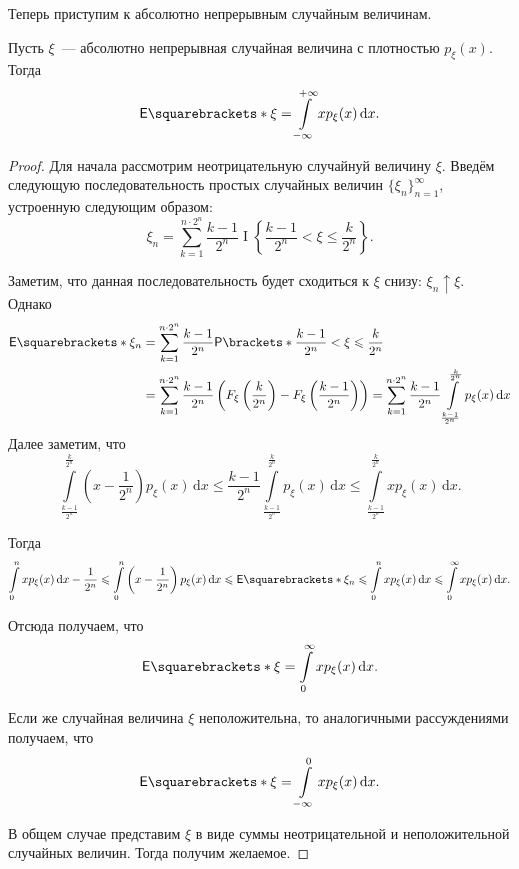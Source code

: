 Теперь приступим к абсолютно непрерывным случайным величинам.
\begin{theorem}
	Пусть \(\xi\)~--- абсолютно непрерывная случайная величина с плотностью \(p_{\xi}(x)\). Тогда
	\[
	\E{\xi} = \int\limits_{-\infty}^{+\infty} xp_{\xi}(x)\,\mathrm{d}x.
	\]
\end{theorem}
\begin{proof}
	Для начала рассмотрим неотрицательную случайнуй величину \(\xi\). Введём следующую последовательность простых случайных величин \(\{\xi_n\}_{n = 1}^{\infty}\), устроенную следующим образом:
	\[
	\xi_n = \sum\limits_{k = 1}^{n \cdot 2^n} \frac{k - 1}{2^n}\mathop{I}\left\{\frac{k - 1}{2^n} < \xi \leq \frac{k}{2^n}\right\}.
	\]
	
	Заметим, что данная последовательность будет сходиться к \(\xi\) снизу: \(\xi_n \uparrow \xi\). Однако
	\begin{align}
		\E{\xi_n} &= \sum\limits_{k = 1}^{n \cdot 2^n} \frac{k - 1}{2^n}\Pr{\frac{k - 1}{2^n} < \xi \leq \frac{k}{2^n}} \\
		&= \sum\limits_{k = 1}^{n \cdot 2^n} \frac{k - 1}{2^n}\left(F_{\xi}\left(\frac{k}{2^n}\right) - F_{\xi}\left(\frac{k - 1}{2^n}\right)\right) = \sum\limits_{k = 1}^{n \cdot 2^n} \frac{k - 1}{2^n}\int\limits_{\frac{k - 1}{2^n}}^{\frac{k}{2^n}} p_{\xi}(x)\,\mathrm{d}x
	\end{align}
	Далее заметим, что
	\[
	\int\limits_{\frac{k - 1}{2^n}}^{\frac{k}{2^n}} \left(x - \frac{1}{2^n}\right) p_{\xi}(x)\,\mathrm{d}x \leq \frac{k - 1}{2^n}\int\limits_{\frac{k - 1}{2^n}}^{\frac{k}{2^n}} p_{\xi}(x)\,\mathrm{d}x \leq \int\limits_{\frac{k - 1}{2^n}}^{\frac{k}{2^n}} xp_{\xi}(x)\,\mathrm{d}x.
	\]
	
	Тогда
	\[
	\int\limits_{0}^{n} xp_{\xi}(x)\,\mathrm{d}x - \frac{1}{2^n} \leq \int\limits_{0}^{n} \left(x - \frac{1}{2^n}\right) p_{\xi}(x)\,\mathrm{d}x \leq \E{\xi_n} \leq \int\limits_{0}^{n} xp_{\xi}(x)\,\mathrm{d}x \leq \int\limits_{0}^{\infty} xp_{\xi}(x)\,\mathrm{d}x.
	\]
	
	Отсюда получаем, что 
	\[
	\E{\xi} = \int\limits_{0}^{\infty} xp_{\xi}(x)\,\mathrm{d}x.
	\]
	
	Если же случайная величина \(\xi\) неположительна, то аналогичными рассуждениями получаем, что
	\[
	\E{\xi} = \int\limits_{-\infty}^{0} xp_{\xi}(x)\,\mathrm{d}x.
	\]
	
	В общем случае представим \(\xi\) в виде суммы неотрицательной и неположительной случайных величин. Тогда получим желаемое.
\end{proof}

